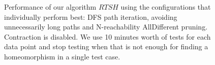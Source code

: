 \begin{figure}


\caption{Performance of our algorithm $\mathit{RTSH}$ using the configurations that individually perform best: DFS path iteration, avoiding unnecessarily long paths and N-reachability AllDifferent pruning. Contraction is disabled. We use 10 minutes worth of tests for each data point and stop testing when that is not enough for finding a homeomorphism in a single test case.}
\label{fig:highperformance}
\end{figure}
